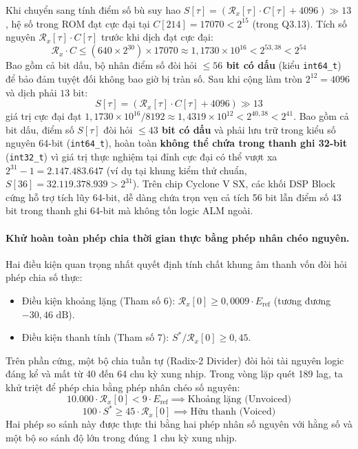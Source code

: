 \documentclass[11pt,a4paper]{article}
\begin{document}
Khi chuyển sang tính điểm số bù suy hao $S[\tau] = (\mathcal{R}_x[\tau] \cdot C[\tau] + 4096) \gg 13$, hệ số trong ROM đạt cực đại tại $C[214] = 17070 < 2^{15}$ (trong Q3.13). Tích số nguyên $\mathcal{R}_x[\tau] \cdot C[\tau]$ trước khi dịch đạt cực đại:
\begin{equation}
\mathcal{R}_x \cdot C \le (640 \times 2^{30}) \times 17070 \approx 1{,}1730 \times 10^{16} < 2^{53{,}38} < 2^{54}
\end{equation}
Bao gồm cả bit dấu, bộ nhân điểm số đòi hỏi \textbf{$\le 56$ bit có dấu} (kiểu \texttt{int64\_t}) để bảo đảm tuyệt đối không bao giờ bị tràn số. Sau khi cộng làm tròn $2^{12} = 4096$ và dịch phải $13\text{ bit}$:
\[
S[\tau] = (\mathcal{R}_x[\tau] \cdot C[\tau] + 4096) \gg 13
\]
giá trị cực đại đạt $1{,}1730 \times 10^{16} / 8192 \approx 1{,}4319 \times 10^{12} < 2^{40{,}38} < 2^{41}$.
Bao gồm cả bit dấu, điểm số $S[\tau]$ đòi hỏi \textbf{$\le 43$ bit có dấu} và phải lưu trữ trong kiểu số nguyên 64-bit (\texttt{int64\_t}), hoàn toàn \textbf{không thể chứa trong thanh ghi 32-bit} (\texttt{int32\_t}) vì giá trị thực nghiệm tại đỉnh cực đại có thể vượt xa $2^{31}-1 = 2.147.483.647$ (ví dụ tại khung kiểm thử chuẩn, $S[36] = 32.119.378.939 > 2^{31}$). Trên chip Cyclone V SX, các khối DSP Block cứng hỗ trợ tích lũy 64-bit, dễ dàng chứa trọn vẹn cả tích 56 bit lẫn điểm số 43 bit trong thanh ghi 64-bit mà không tốn logic ALM ngoài.

\paragraph{Khử hoàn toàn phép chia thời gian thực bằng phép nhân chéo nguyên.}
Hai điều kiện quan trọng nhất quyết định tính chất khung âm thanh vốn đòi hỏi phép chia số thực:
\begin{itemize}
    \setlength{\itemsep}{0.5pt}
    \item Điều kiện khoảng lặng (Tham số 6): $\mathcal{R}_x[0] \ge 0{,}0009 \cdot E_{\text{ref}}$ (tương đương $-30{,}46\text{ dB}$).
    \item Điều kiện thanh tính (Tham số 7): $S^* / \mathcal{R}_x[0] \ge 0{,}45$.
\end{itemize}
Trên phần cứng, một bộ chia tuần tự (Radix-2 Divider) đòi hỏi tài nguyên logic đáng kể và mất từ 40 đến 64 chu kỳ xung nhịp. Trong vòng lặp quét 189 lag, ta khử triệt để phép chia bằng phép nhân chéo số nguyên:
\begin{equation}
10.000 \cdot \mathcal{R}_x[0] < 9 \cdot E_{\text{ref}} \implies \text{Khoảng lặng (Unvoiced)}
\end{equation}
\begin{equation}
100 \cdot S^* \ge 45 \cdot \mathcal{R}_x[0] \implies \text{Hữu thanh (Voiced)}
\end{equation}
Hai phép so sánh này được thực thi bằng hai phép nhân số nguyên với hằng số và một bộ so sánh độ lớn trong đúng 1 chu kỳ xung nhịp.
\end{document}
